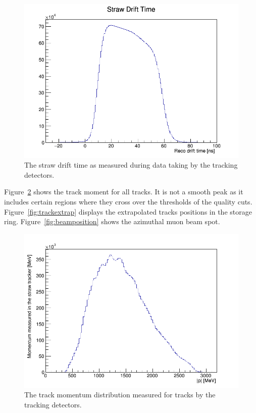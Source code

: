 \begin{figure}[th]
\centering
\includegraphics[scale=0.4]{Figures/StrawDriftTime_.png}
\decoRule
\caption{The straw drift time as measured during data taking by the tracking detectors.}
\label{fig:StrawDriftTime}
\end{figure}

Figure~\ref{fig:hMomentum} shows the track moment for all tracks. It is not a smooth peak as it includes certain regions where they cross over the thresholds of the quality cuts. Figure~\ref{fig:trackextrap} displays the extrapolated tracks positions in the storage ring. Figure~\ref{fig:beamposition} shows the azimuthal muon beam spot.

\begin{figure}[th]
\centering
\includegraphics[scale=0.4]{Figures/hMomentum_.png}
\decoRule
\caption{The track momentum distribution measured for tracks by the tracking detectors.}
\label{fig:hMomentum}
\end{figure}

